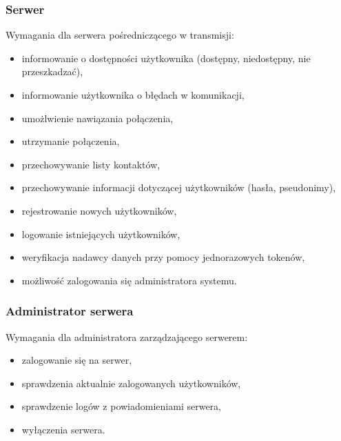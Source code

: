 \documentclass[12pt,a4paper]{article}
\begin{document}
	\subsubsection{Serwer}
	\par Wymagania dla serwera pośredniczącego w transmisji:
	\begin{itemize}
		\item informowanie o dostępności użytkownika (dostępny, niedostępny, nie przeszkadzać),
		\item informowanie użytkownika o błędach w komunikacji,
		\item umożlwienie nawiązania połączenia, 
		\item utrzymanie połączenia, 
		\item przechowywanie listy kontaktów, 
		\item przechowywanie informacji dotyczącej użytkowników (hasła, pseudonimy),
		\item rejestrowanie nowych użytkowników,
		\item logowanie istniejących użytkowników,
		\item weryfikacja nadawcy danych przy pomocy jednorazowych tokenów,
		\item możliwość zalogowania się administratora systemu.
	\end{itemize}
	
	\subsubsection{Administrator serwera}
	\par Wymagania dla administratora zarządzającego serwerem:
	\begin{itemize}
		\item zalogowanie się na serwer,
		\item sprawdzenia aktualnie zalogowanych użytkowników,
		\item sprawdzenie logów z powiadomieniami serwera,
		\item wyłączenia serwera.
	\end{itemize}
	
\end{document}
